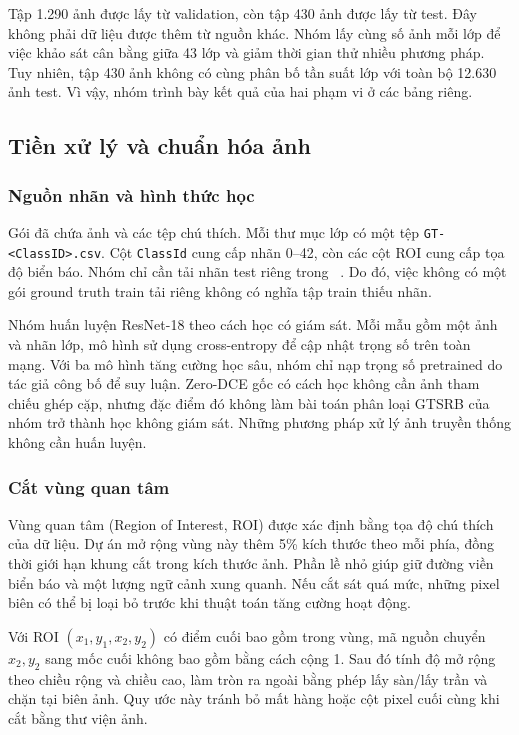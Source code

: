 Tập 1.290 ảnh được lấy từ validation, còn tập 430 ảnh được lấy từ test. Đây không phải dữ liệu được thêm từ nguồn khác. Nhóm lấy cùng số ảnh mỗi lớp để việc khảo sát cân bằng giữa 43 lớp và giảm thời gian thử nhiều phương pháp. Tuy nhiên, tập 430 ảnh không có cùng phân bố tần suất lớp với toàn bộ 12.630 ảnh test. Vì vậy, nhóm trình bày kết quả của hai phạm vi ở các bảng riêng.

\subsection{Tiền xử lý và chuẩn hóa ảnh}
\subsubsection{Nguồn nhãn và hình thức học}
Gói  đã chứa ảnh và các tệp chú thích. Mỗi thư mục lớp có một tệp \texttt{GT-<ClassID>.csv}. Cột \texttt{ClassId} cung cấp nhãn 0--42, còn các cột ROI cung cấp tọa độ biển báo. Nhóm chỉ cần tải nhãn test riêng trong ~\cite{gtsrbdata}. Do đó, việc không có một gói ground truth train tải riêng không có nghĩa tập train thiếu nhãn.

Nhóm huấn luyện ResNet-18 theo cách học có giám sát. Mỗi mẫu gồm một ảnh và nhãn lớp, mô hình sử dụng cross-entropy để cập nhật trọng số trên toàn mạng. Với ba mô hình tăng cường học sâu, nhóm chỉ nạp trọng số pretrained do tác giả công bố để suy luận. Zero-DCE gốc có cách học không cần ảnh tham chiếu ghép cặp, nhưng đặc điểm đó không làm bài toán phân loại GTSRB của nhóm trở thành học không giám sát. Những phương pháp xử lý ảnh truyền thống không cần huấn luyện.

\subsubsection{Cắt vùng quan tâm}
Vùng quan tâm (Region of Interest, ROI) được xác định bằng tọa độ chú thích của dữ liệu. Dự án mở rộng vùng này thêm 5\% kích thước theo mỗi phía, đồng thời giới hạn khung cắt trong kích thước ảnh. Phần lề nhỏ giúp giữ đường viền biển báo và một lượng ngữ cảnh xung quanh. Nếu cắt sát quá mức, những pixel biên có thể bị loại bỏ trước khi thuật toán tăng cường hoạt động.

Với ROI $(x_1,y_1,x_2,y_2)$ có điểm cuối bao gồm trong vùng, mã nguồn chuyển $x_2,y_2$ sang mốc cuối không bao gồm bằng cách cộng 1. Sau đó tính độ mở rộng theo chiều rộng và chiều cao, làm tròn ra ngoài bằng phép lấy sàn/lấy trần và chặn tại biên ảnh. Quy ước này tránh bỏ mất hàng hoặc cột pixel cuối cùng khi cắt bằng thư viện ảnh.

